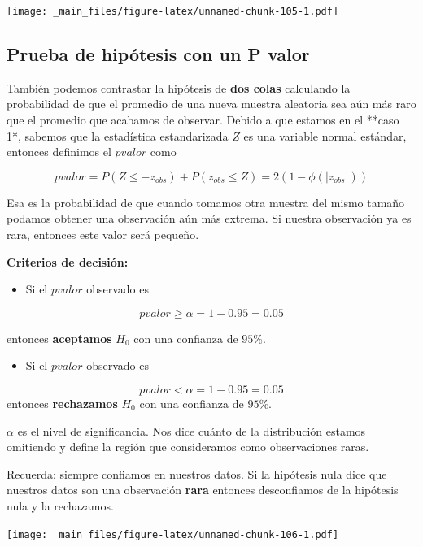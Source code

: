\documentclass[
]{book}
\providecommand{\tightlist}{%
  \setlength{\itemsep}{0pt}\setlength{\parskip}{0pt}}
\begin{document}
\texttt{[image: \_main\_files/figure-latex/unnamed-chunk-105-1.pdf]}

\hypertarget{prueba-de-hipuxf3tesis-con-un-p-valor}{%
\subsection{Prueba de hipótesis con un P valor}\label{prueba-de-hipuxf3tesis-con-un-p-valor}}

También podemos contrastar la hipótesis de \textbf{dos colas} calculando la probabilidad de que el promedio de una nueva muestra aleatoria sea aún más raro que el promedio que acabamos de observar. Debido a que estamos en el **caso 1*, sabemos que la estadística estandarizada \(Z\) es una variable normal estándar, entonces definimos el \(pvalor\) como

\[pvalor = P(Z \leq -z_{obs}) + P(z_{obs} \leq Z) = 2 (1-\phi(|z_{obs}|))\]

Esa es la probabilidad de que cuando tomamos otra muestra del mismo tamaño podamos obtener una observación aún más extrema. Si nuestra observación ya es rara, entonces este valor será pequeño.

\textbf{Criterios de decisión:}

\begin{itemize}
\tightlist
\item
  Si el \(pvalor\) observado es
\end{itemize}

\[pvalor \geq \alpha =1-0.95=0.05\]

entonces \textbf{aceptamos} \(H_0\) con una confianza de \(95\%\).

\begin{itemize}
\tightlist
\item
  Si el \(pvalor\) observado es
\end{itemize}

\[pvalor < \alpha =1-0.95=0.05\]
entonces \textbf{rechazamos} \(H_0\) con una confianza de \(95\%\).

\(\alpha\) es el nivel de significancia. Nos dice cuánto de la distribución estamos omitiendo y define la región que consideramos como observaciones raras.

Recuerda: siempre confiamos en nuestros datos. Si la hipótesis nula dice que nuestros datos son una observación \textbf{rara} entonces desconfiamos de la hipótesis nula y la rechazamos.

\texttt{[image: \_main\_files/figure-latex/unnamed-chunk-106-1.pdf]}
\end{document}
